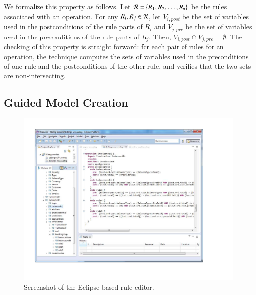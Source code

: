 We formalize this property as follows. Let ${\cal R} = \{R_1, R_2, \ldots,
R_n\}$ be the rules associated with an operation. For any $R_i, R_j \in {\cal
  R}$, let $V_{i, \mathit{post}}$ be the set of variables used in the
postconditions of the rule parts of $R_i$ and $V_{j, \mathit{pre}}$ be the set
of variables used in the preconditions of the rule parts of $R_j$. Then, $V_{i,
  \mathit{post}} \cap V_{j, \mathit{pre}} = \emptyset$. The checking of this
property is straight forward: for each pair of rules for an operation, the
technique computes the sets of variables used in the preconditions of one rule
and the postconditions of the other rule, and verifies that the two sets are
non-intersecting.

\subsection{Guided Model Creation}

\begin{figure}[t]
\centering
\includegraphics[trim=43 65 114 36,clip,width=\columnwidth]{figs/rule-editor.pdf}
\vspace*{-13pt}
\caption{Screenshot of the Eclipse-based rule editor.}
\vspace*{-0pt}
\label{fig:rule-editor}
\end{figure}

